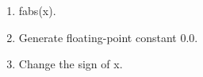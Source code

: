 \documentclass{article}
\begin{document}
\begin{enumerate}[label=\textbf{\Alph*.}]
\item
fabs(x).
\item
Generate floating-point constant 0.0.
\item
Change the sign of x.
\end{enumerate}
\end{document}
